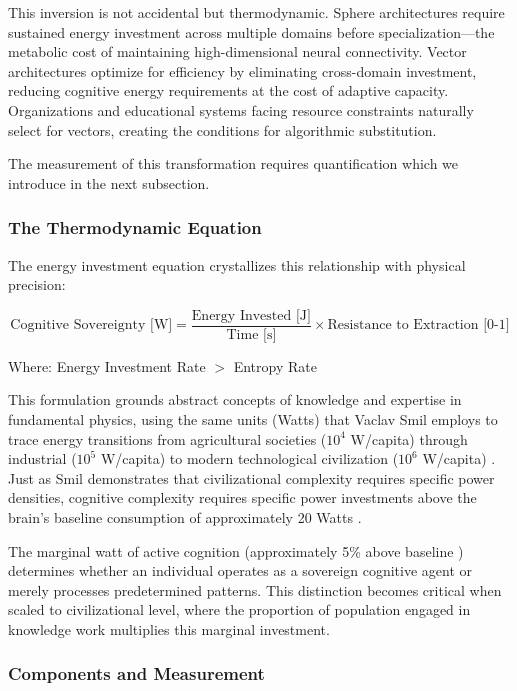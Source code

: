 This inversion is not accidental but thermodynamic. Sphere architectures require sustained energy investment across multiple domains before specialization—the metabolic cost of maintaining high-dimensional neural connectivity. Vector architectures optimize for efficiency by eliminating cross-domain investment, reducing cognitive energy requirements at the cost of adaptive capacity. Organizations and educational systems facing resource constraints naturally select for vectors, creating the conditions for algorithmic substitution.

The measurement of this transformation requires quantification which we introduce in the next subsection.

\subsubsection{The Thermodynamic Equation}

The energy investment equation crystallizes this relationship with physical precision:

\begin{equation}
\text{Cognitive Sovereignty [W]} = \frac{\text{Energy Invested [J]}}{\text{Time [s]}} \times \text{Resistance to Extraction [0-1]}
\end{equation}

Where: Energy Investment Rate $>$ Entropy Rate

This formulation grounds abstract concepts of knowledge and expertise in fundamental physics, using the same units (Watts) that Vaclav Smil employs to trace energy transitions from agricultural societies ($10^4$ W/capita) through industrial ($10^5$ W/capita) to modern technological civilization ($10^6$ W/capita) \citep{smil2017}. Just as Smil demonstrates that civilizational complexity requires specific power densities, cognitive complexity requires specific power investments above the brain's baseline consumption of approximately 20 Watts \citep{raichle2002}.

The marginal watt of active cognition (approximately 5\% above baseline \citep{jamadar2025}) determines whether an individual operates as a sovereign cognitive agent or merely processes predetermined patterns. This distinction becomes critical when scaled to civilizational level, where the proportion of population engaged in knowledge work multiplies this marginal investment.

\subsubsection{Components and Measurement}

